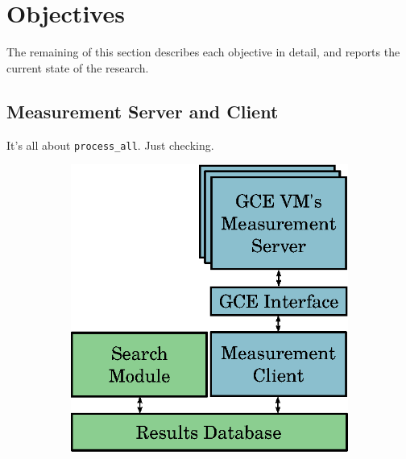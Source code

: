 \documentclass[a4paper, 12pt]{article}
\begin{document}
\section{Objectives} \label{sec:obj}

The remaining of this section describes each objective in detail,
and reports the current state of the research.

\subsection{Measurement Server and Client}

It's all about \texttt{\footnotesize process\_all}. Just checking.

\begin{figure}[htpb]
    \centering
    \begin{subfigure}{.45\textwidth}
        \centering
        \includegraphics[scale=.75]{high-level-implementation}
        \caption{}
        \label{fig:high-level}
    \end{subfigure}%
    \begin{subfigure}{.45\textwidth}
        \centering

\end{subfigure}
\end{figure}
\end{document}
